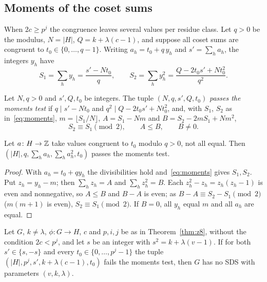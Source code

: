 \subsection{Moments of the coset sums}
When $2c \ge p^j$ the congruence leaves several values per residue class. Let
$q > 0$ be the modulus, $N = |H|$, $Q = k + \lambda(c - 1)$, and suppose all coset sums are
congruent to $t_0 \in \{0, \dots, q - 1\}$. Writing $a_h = t_0 + q\, y_h$ and $s' = \sum_h a_h$,
the integers $y_h$ have
\begin{equation}\label{eq:moments}
  S_1 = \sum_h y_h = \frac{s' - N t_0}{q}, \qquad
  S_2 = \sum_h y_h^2 = \frac{Q - 2 t_0 s' + N t_0^2}{q^2}.
\end{equation}

\begin{definition}\label{def:moments}
Let $N, q > 0$ and $s', Q, t_0$ be integers. The tuple $(N, q, s', Q, t_0)$ \emph{passes the
moments test} if $q \mid s' - N t_0$ and $q^2 \mid Q - 2 t_0 s' + N t_0^2$, and, with $S_1$,
$S_2$ as in~\eqref{eq:moments}, $m = \lfloor S_1 / N \rfloor$, $A = S_1 - N m$ and
$B = S_2 - 2 m S_1 + N m^2$,
\[
  S_2 \equiv S_1 \pmod 2, \qquad A \le B, \qquad B \neq 0 .
\]
\end{definition}

\begin{lemma}\label{lem:moments}
Let $a \colon H \to \mathbb{Z}$ take values congruent to $t_0$ modulo $q > 0$, not all equal. Then
$(|H|, q, \sum_h a_h, \sum_h a_h^2, t_0)$ passes the moments test.
\end{lemma}

\begin{proof}
With $a_h = t_0 + q y_h$ the divisibilities hold and~\eqref{eq:moments} gives $S_1, S_2$. Put
$z_h = y_h - m$; then $\sum_h z_h = A$ and $\sum_h z_h^2 = B$. Each $z_h^2 - z_h = z_h(z_h - 1)$
is even and nonnegative, so $A \le B$ and $B - A$ is even; as $B - A \equiv S_2 - S_1 \pmod 2$
($m(m+1)$ is even), $S_2 \equiv S_1 \pmod 2$. If $B = 0$, all $y_h$ equal $m$ and all $a_h$
are equal.
\end{proof}

\begin{theorem}\label{thm:z9}
Let $G$, $k \neq \lambda$, $\phi \colon G \to H$, $c$ and $p, i, j$ be as in
Theorem~\ref{thm:z8}, without the condition $2c < p^j$, and let $s$ be an integer with
$s^2 = k + \lambda(v - 1)$. If for both $s' \in \{s, -s\}$ and every
$t_0 \in \{0, \dots, p^j - 1\}$ the tuple $(|H|, p^j, s', k + \lambda(c-1), t_0)$ fails the
moments test, then $G$ has no SDS with parameters $(v,k,\lambda)$.
\end{theorem}

